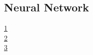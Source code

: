 \documentclass[12pt]{article}
\newcommand{\nextproblem}{
	\vfill
	\pagebreak
}
\begin{document}
\subsection{Neural Network}


\nextproblem

\href{https://www.quora.com/What-are-C-and-gamma-with-regards-to-a-support-vector-machine}{1} \\
\href{https://scikit-learn.org/stable/auto_examples/svm/plot_rbf_parameters.html}{2} \\
\href{https://machinelearningmastery.com/save-load-machine-learning-models-python-scikit-learn/}{3} \\
\end{document}
